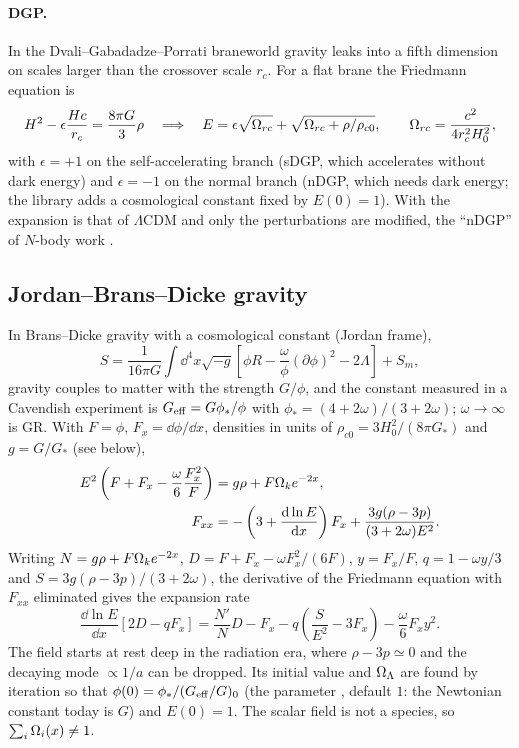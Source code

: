 \paragraph*{DGP.} In the Dvali--Gabadadze--Porrati braneworld \cite{Dvali2000} gravity leaks into a fifth dimension
on scales larger than the crossover scale $r_c$. For a flat brane the Friedmann equation is
\begin{equation}
H^2-\epsilon\frac{Hc}{r_c}=\frac{8\pi G}{3}\rho\quad\Longrightarrow\quad
E=\epsilon\sqrt{\Omega_{rc}}+\sqrt{\Omega_{rc}+\rho/\rho_{c0}},\qquad \Omega_{rc}=\frac{c^2}{4r_c^2H_0^2},
\end{equation}
with $\epsilon=+1$ on the self-accelerating branch (sDGP, which accelerates without dark energy) and $\epsilon=-1$ on
the normal branch (nDGP, which needs dark energy; the library adds a cosmological constant fixed by $E(0)=1$). With
 the expansion is that of $\Lambda$CDM and only the perturbations are modified, the
``nDGP'' of $N$-body work \cite{Schmidt2009}.

\subsection{Jordan--Brans--Dicke gravity}\label{sec:bg-bransdicke}

In Brans--Dicke gravity \cite{BransDicke1961} with a cosmological constant (Jordan frame),
\begin{equation}
S=\frac{1}{16\pi G}\int\dd^4x\sqrt{-g}\left[\phi R-\frac{\omega}{\phi}(\partial\phi)^2-2\Lambda\right]+S_m,
\end{equation}
gravity couples to matter with the strength $G/\phi$, and the constant measured in a Cavendish experiment is
$G_{\rm eff}=G\phi_*/\phi$ with $\phi_*=(4+2\omega)/(3+2\omega)$; $\omega\to\infty$ is GR. With $F=\phi$,
$F_x=\dd\phi/\dd x$, densities in units of $\rho_{c0}=3H_0^2/(8\pi G_*)$ and $g=G/G_*$ (see below),
\begin{align}
E^2\left(F+F_x-\frac{\omega}{6}\frac{F_x^2}{F}\right)&=g\rho+F\Omega_ke^{-2x},\\
F_{xx}&=-\left(3+\frac{\mathrm{d}\ln E}{\mathrm{d} x}\right)F_x+\frac{3g(\rho-3p)}{(3+2\omega)E^2}.
\end{align}
Writing $N=g\rho+F\Omega_ke^{-2x}$, $D=F+F_x-\omega F_x^2/(6F)$, $y=F_x/F$, $q=1-\omega y/3$ and
$S=3g(\rho-3p)/(3+2\omega)$, the derivative of the Friedmann equation with $F_{xx}$ eliminated gives the expansion rate
\begin{equation}
\frac{\dd\ln E}{\dd x}\left[2D-qF_x\right]=\frac{N'}{N}D-F_x-q\left(\frac{S}{E^2}-3F_x\right)-\frac{\omega}{6}F_xy^2 .
\end{equation}
The field starts at rest deep in the radiation era, where $\rho-3p\simeq0$ and the decaying mode $\propto1/a$ can be
dropped. Its initial value and $\Omega_\Lambda$ are found by iteration so that $\phi(0)=\phi_*/(G_{\rm eff}/G)_0$ (the
parameter , default $1$: the Newtonian constant today is $G$) and $E(0)=1$. The scalar field is
not a species, so $\sum_i\Omega_i(x)\neq1$.

